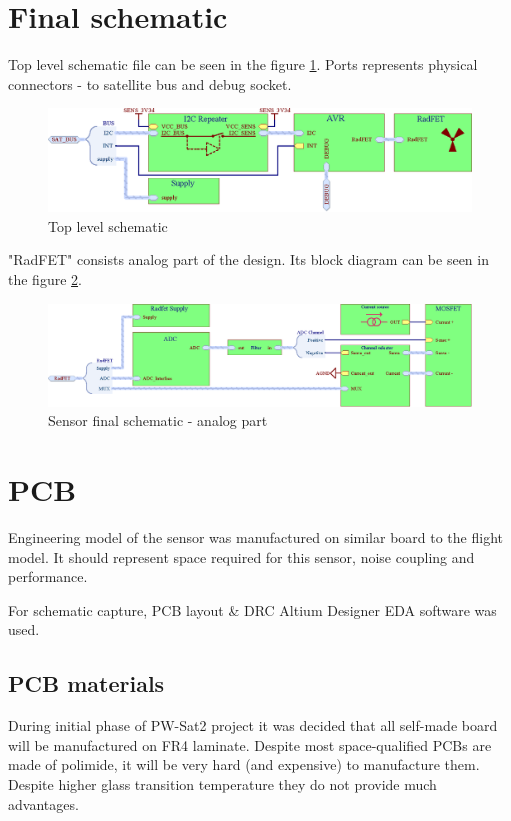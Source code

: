 \section{Final schematic}
    Top level schematic file can be seen in the figure \ref{top_level_schematic}. Ports represents physical connectors - to satellite bus and debug socket.

    \begin{figure}[H]
        \centering
        \includegraphics[width=0.8\paperwidth]{img/06/final_schematic_top.eps}
        \caption{Top level schematic}
        \label{top_level_schematic}
    \end{figure}

    "RadFET" consists analog part of the design. Its block diagram can be seen in the figure \ref{analog_schematic}.

    \begin{figure}[H]
        \centering
        \includegraphics[width=0.8\paperwidth]{img/06/final_schematic_radfet.eps}
        \caption{Sensor final schematic - analog part}
        \label{analog_schematic}
    \end{figure}


\section{PCB}
    Engineering model of the sensor was manufactured on similar board to the flight model. It should represent space required for this sensor, noise coupling and performance.

    For schematic capture, PCB layout \& DRC Altium Designer EDA software was used.

    \subsection{PCB materials}
        During initial phase of PW-Sat2 project it was decided that all self-made board will be manufactured on FR4 laminate. Despite most space-qualified PCBs are made of polimide, it will be very hard (and expensive) to manufacture them. Despite higher glass transition temperature they do not provide much advantages.

